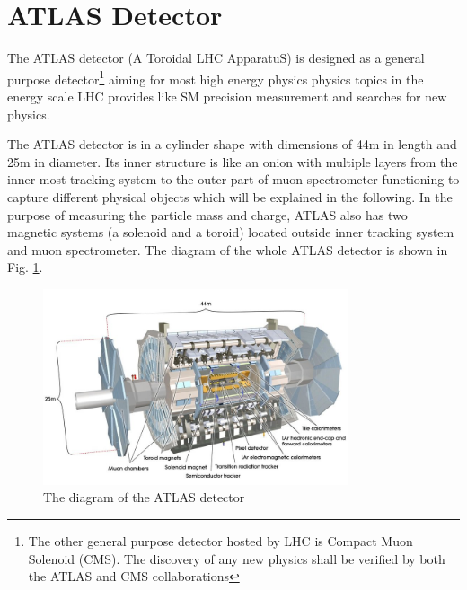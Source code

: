 \section{ATLAS Detector}
The ATLAS detector (A Toroidal LHC ApparatuS) is designed as a general purpose detector\footnote{The other general purpose detector hosted by LHC is Compact Muon Solenoid (CMS). The discovery of any new physics shall be verified by both the ATLAS and CMS collaborations} aiming for most high energy physics physics topics in the energy scale LHC provides like SM precision measurement and searches for new physics.

The ATLAS detector is in a cylinder shape with dimensions of 44m in length and 25m in diameter. Its inner structure is like an onion with multiple layers from the inner most tracking system to the outer part of muon spectrometer functioning to capture different physical objects which will be explained in the following. In the purpose of measuring the particle mass and charge, ATLAS also has two magnetic systems (a solenoid and a toroid) located outside inner tracking system and muon spectrometer. The diagram of the whole ATLAS detector is shown in Fig. \ref{Fig:ATLAS}.

\begin{figure}[!h]                
	\includegraphics[width=0.8\textwidth]{Chapter2/ATLAS.jpg}
	\centering
	\begin{center}
		\caption{The diagram of the ATLAS detector}
		\label{Fig:ATLAS}            
	\end{center}
\end{figure}

